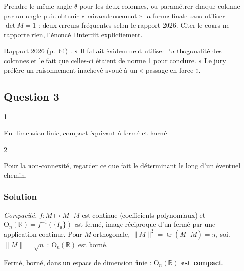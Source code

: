 \documentclass[11pt,a4paper]{article}
\begin{document}
\begin{piege}

Prendre le même angle \(\theta\) pour les deux colonnes, ou paramétrer chaque colonne par un angle puis obtenir « miraculeusement » la forme finale sans utiliser \(\det M=1\) : deux erreurs fréquentes selon le rapport 2026. Citer le cours ne rapporte rien, l'énoncé l'interdit explicitement.

\end{piege}

\begin{jury}

Rapport 2026 (p.~64) : « Il fallait évidemment utiliser l'orthogonalité des colonnes et le fait que celles-ci étaient de norme 1 pour conclure. » Le jury préfère un raisonnement inachevé avoué à un « passage en force ».

\end{jury}

\hypertarget{question-3}{%
\subsection{Question 3}\label{question-3}}

\begin{indication}{1}

En dimension finie, compact équivaut à fermé et borné.

\end{indication}

\begin{indication}{2}

Pour la non-connexité, regarder ce que fait le déterminant le long d'un éventuel chemin.

\end{indication}

\hypertarget{solution-2}{%
\subsubsection{Solution}\label{solution-2}}

\emph{Compacité.} \(f:M\mapsto M^\top M\) est continue (coefficients polynomiaux) et \({\mathrm{O}}_n(\mathbb{R})=f^{-1}(\{I_n\})\) est fermé, image réciproque d'un fermé par une application continue. Pour \(M\) orthogonale, \(\|M\|^2=\operatorname{tr}(M^\top M)=n\), soit \(\|M\|=\sqrt n\) : \({\mathrm{O}}_n(\mathbb{R})\) est borné.

Fermé, borné, dans un espace de dimension finie : \textbf{\({\mathrm{O}}_n(\mathbb{R})\) est compact}.
\end{document}
